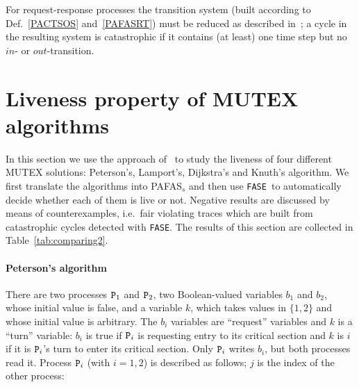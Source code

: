 \documentclass[copyright,creativecommons]{eptcs}
\newcommand{\fase}{\texttt{FASE}}
\newcommand{\proc}{{\tt P}}
\begin{document}
For request-response processes the transition system (built according to
Def.~\ref{PACTSOS} and~\ref{PAFASRT}) must be reduced as described
in~\cite{CV05}; a cycle in the resulting system is catastrophic if it
contains (at least) one time step but no $in$- or $out$-transition.

\section{Liveness property of MUTEX algorithms}\label{algos}
In this section we use the approach of~\cite{CDV08tr} to study the liveness
of four different MUTEX solutions: Peterson's, Lamport's, Dijkstra's and 
Knuth's algorithm. We first translate the algorithms into PAFAS$_s$ and
then use \fase\ to automatically decide whether each of them is live or
not. Negative results are discussed by means of counterexamples, i.e.\ fair
violating traces which are built from catastrophic cycles detected with
\fase. The results of this section are collected in
Table~\ref{tab:comparing2}.

\paragraph{Peterson's algorithm}\label{sec:peterson}
There are two processes $\proc_1$ and $\proc_2$, two Boolean-valued
variables $b_1$ and $b_2$, whose initial value is false, and a variable
$k$, which takes values in $\{1,2\}$ and whose initial value is arbitrary.
The $b_i$ variables are ``request'' variables and $k$ is a ``turn''
variable: $b_i$ is true if $\proc_i$ is requesting entry to its critical
section and $k$ is $i$ if it is $\proc_i$'s turn to enter its critical
section. Only $\proc_i$ writes $b_i$, but both processes read it. Process 
$\proc_i$ (with $i=1,2$) is described as follows;  $j$ is the index of the
other process:
\end{document}
